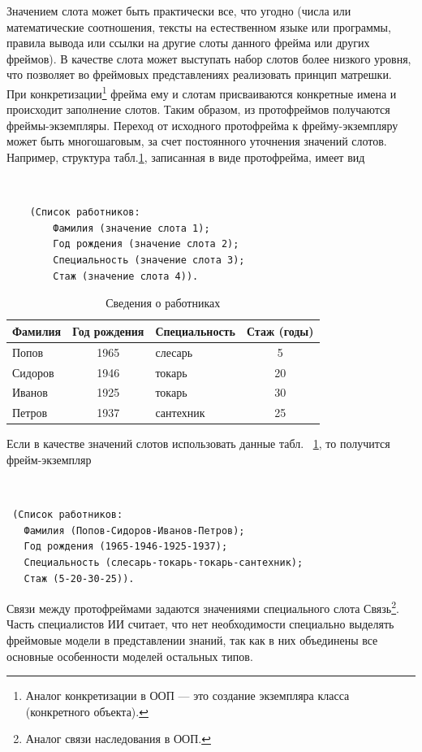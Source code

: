 \documentclass[12pt, openany, twoside]{book} %
\begin{document}
Значением слота может быть практически все, что угодно (числа или математические соотношения, тексты на естественном языке или программы, правила вывода или ссылки на другие слоты данного фрейма или других фреймов). В качестве слота может выступать набор слотов более низкого уровня, что позволяет во фреймовых представлениях реализовать принцип матрешки. При конкретизации\footnote{Аналог конкретизации в ООП --- это создание экземпляра класса (конкретного объекта).} фрейма ему и слотам присваиваются конкретные имена и происходит заполнение слотов. Таким образом, из протофреймов получаются фреймы-экземпляры. Переход от исходного протофрейма к фрейму-эк\-зем\-пля\-ру может быть многошаговым, за счет постоянного
уточнения значений слотов. Например, структура табл.\ref{tab:frame}, записанная в виде протофрейма, имеет вид
{\tt
\begin{verbatim}
    (Список работников:
        Фамилия (значение слота 1);
        Год рождения (значение слота 2);
        Специальность (значение слота 3);
        Стаж (значение слота 4)).
\end{verbatim}}

\begin{table}[h]
\caption{Сведения о работниках} \label{tab:frame}
\begin{center}
\begin{tabular}{|lclc|}
 \hline
 Фамилия & Год рождения  &  Специальность &  Стаж (годы)
 \\\hline\hline
 Попов &  1965 &   слесарь & 5
   \\\hline
   Сидоров & 1946  &  токарь & 20
    \\\hline
    Иванов & 1925  &  токарь & 30
    \\\hline
    Петров & 1937  &  сантехник &  25
    \\\hline
\end{tabular}
\end{center}
\end{table}

Если в качестве значений слотов использовать данные табл.~ \ref{tab:frame}, то получится фрейм-экземпляр
{\tt
\begin{verbatim}
 (Список работников:
   Фамилия (Попов-Сидоров-Иванов-Петров);
   Год рождения (1965-1946-1925-1937);
   Специальность (слесарь-токарь-токарь-сантехник);
   Стаж (5-20-30-25)).
\end{verbatim}}

Связи между протофреймами задаются значениями специального слота Связь\footnote{Аналог связи наследования в ООП.}. Часть специалистов ИИ считает, что нет необходимости специально выделять фреймовые модели в представлении знаний, так как в них объединены все основные особенности моделей остальных типов.
\end{document}
